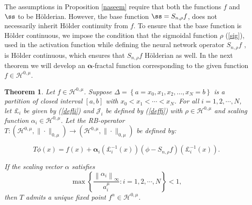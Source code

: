 \documentclass{article}[12pt, a4]
\newtheorem{theorem}{\large Theorem}[section]
\begin{document}
	The assumptions in Proposition \ref{naseem} require that both the functions $f$ and 
	$\ss$ to be H\"{o}lderian. However, the base function $\ss=S_{n,\rho}f$,  does not necessarily inherit H\"{o}lder continuity from $f$.  To ensure that the base function is H\"{o}lder continuous, we impose the condition that the sigmoidal function $\rho$ (\ref{sig}), used in the activation function while defining the neural network operator $S_{n,\rho}f$ \cite{QIAN2022126781}, is H\"{o}lder continuous, which ensures that $S_{n,\rho}f$ H\"{o}lderian as well. In the next theorem we will develop an $\boldsymbol{\alpha}$-fractal function corresponding to the given function $f\in \mathcal{H}^{0,\mu}$.
	
	\begin{theorem}\label{Thml}
		Let $f \in \mathcal{H}^{0,\mu}$. Suppose $\Delta=\left\{a=x_{0}, x_{1}, x_{2}, \ldots, x_{N}=b\right\}$ is a partition of closed interval $[a,b]$ with $x_{0}<x_{1}<\cdots<x_{N}$. For all $i =1,2,\cdots,N$, let $\pounds_{i}$ be given by (\ref{defli}) and $\mathcal{J}_i$ be defined by (\ref{deffi}) with $\rho \in \mathcal{H}^{0,\mu}$ and scaling function
		$\alpha_{i} \in \mathcal{H}^{0,\mu}$. Let the RB-operator $T:\left(\mathcal{H}^{0,\mu},\|\cdot\|_{0, \mu}\right) \rightarrow\left(\mathcal{H}^{0,\mu},\|\cdot\|_{0, \mu}\right)$  be defined by:
		
		\begin{equation*}
			T\phi(x)=f(x)+\boldsymbol{\alpha}_{i}\left(\pounds_{i}^{-1}(x)\right)\left(\phi-S_{n,\rho} f\right)\left(\pounds_{i}^{-1}(x)\right).
		\end{equation*}
		
		\noindent If the scaling vector $\alpha$ satisfies 
		\begin{equation}\label{scale}
			\max \left\{\frac{\left\|\alpha_{i}\right\|_{\infty}}{a_{i}^{\mu}}: i =1,2,\cdots,N\right\}<1,
		\end{equation} then  $T$ admits a unique fixed point $f^{\alpha} \in \mathcal{H}^{0,\mu}$.\\
	\end{theorem}
	
\end{document}
